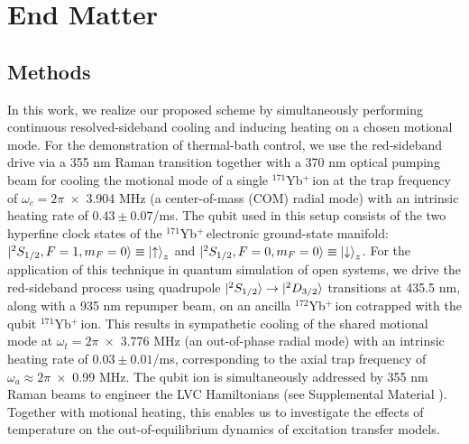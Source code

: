 \documentclass[%
reprint,
superscriptaddress,
amsmath,amssymb,
aps,
prl,
floatfix,
]{revtex4-2}
\newcommand{\Yb}{$^{171}$Yb$^+\,$}
\newcommand{\Ybc}{$^{172}$Yb$^+\,$}
\begin{document}



\section*{End Matter}
\label{sec:end_matter}

\subsection*{Methods}

In this work, we realize our proposed scheme by simultaneously performing continuous resolved-sideband cooling and inducing heating on a chosen motional mode. For the demonstration of thermal-bath control, we use the red-sideband drive via a 355 nm Raman transition together with a 370 nm optical pumping beam for cooling the motional mode of a single \Yb ion at the trap frequency of $\omega_c=2\pi\;\times$ 3.904 MHz (a center-of-mass (COM) radial mode) with an intrinsic heating rate of $0.43\pm0.07$/ms. The qubit used in this setup consists of the two hyperfine clock states of the \Yb electronic ground-state manifold: $\ket{^2S_{1/2}, F=1, m_F=0}\equiv\ket{\uparrow}_z$ and $\ket{^2S_{1/2}, F=0, m_F=0}\equiv\ket{\downarrow}_z$.
For the application of this technique in quantum simulation of open systems, we drive the red-sideband process using quadrupole $\ket{^2S_{1/2}}\rightarrow\ket{^2D_{3/2}}$ transitions at 435.5 nm, along with a 935 nm repumper beam, on an ancilla \Ybc ion cotrapped with the qubit \Yb ion. This results in sympathetic cooling of the shared motional mode at $\omega_t =2\pi\;\times$ 3.776 MHz (an out-of-phase radial mode) with an intrinsic heating rate of $0.03\pm0.01$/ms, corresponding to the axial trap frequency of $\omega_a\approx2\pi\;\times$ 0.99 MHz. The qubit ion is simultaneously addressed by 355 nm Raman beams to engineer the LVC Hamiltonians \cite{so2024electrontransfer,so2025multimode} (see Supplemental Material \cite{so2025fT_supp}). Together with motional heating, this enables us to investigate the effects of temperature on the out-of-equilibrium dynamics of excitation transfer models.
\end{document}
